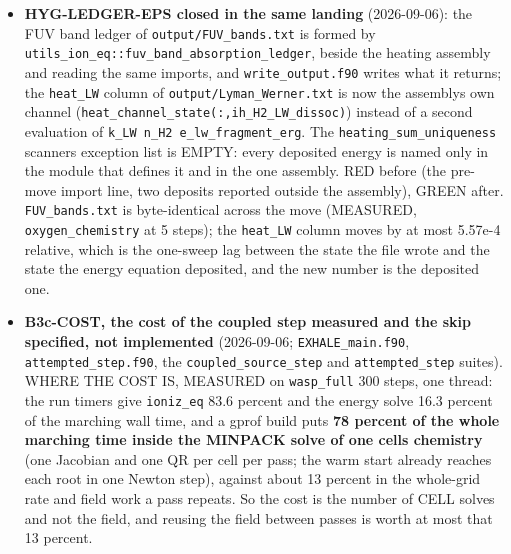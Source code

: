 \documentclass[english,a4paper]{my_memo}
\begin{document}
\begin{itemize}
  the He+ row of \texttt{mol\_heh\_rows} (\texttt{System\_HeH\_mol.f90}), not this item\textquotesingle s file;
  \texttt{dom\_cells\_HeP} is the observable.
  \textbf{Not done, carried over:} the thermodynamic CO ceiling is still in
  \texttt{limit\_to\_element\_budget}; deleting it changes \texttt{EXHALE\_main.f90},
  \texttt{certification.f90} and \texttt{write\_setup\_report.f90}, none of them this
  item\textquotesingle s files. The exact lines are in the item\textquotesingle s report.
\item
  \textbf{HYG-LEDGER-EPS closed in the same landing} (2026-09-06): the FUV band
  ledger of \texttt{output/FUV\_bands.txt} is formed by
  \texttt{utils\_ion\_eq::fuv\_band\_absorption\_ledger}, beside the heating assembly
  and reading the same imports, and \texttt{write\_output.f90} writes what it
  returns; the \texttt{heat\_LW} column of \texttt{output/Lyman\_Werner.txt} is now the
  assembly\textquotesingle s own channel (\texttt{heat\_channel\_state(:,ih\_H2\_LW\_dissoc)}) instead
  of a second evaluation of \texttt{k\_LW\ n\_H2\ e\_lw\_fragment\_erg}. The
  \texttt{heating\_sum\_uniqueness} scanner\textquotesingle s exception list is EMPTY: every
  deposited energy is named only in the module that defines it and in the
  one assembly. RED before (the pre-move import line, two deposits reported
  outside the assembly), GREEN after. \texttt{FUV\_bands.txt} is byte-identical
  across the move (MEASURED, \texttt{oxygen\_chemistry} at 5 steps); the \texttt{heat\_LW}
  column moves by at most 5.57e-4 relative, which is the one-sweep lag
  between the state the file wrote and the state the energy equation
  deposited, and the new number is the deposited one.
\item
  \textbf{B3c-COST, the cost of the coupled step measured and the skip specified,
  not implemented} (2026-09-06; \texttt{EXHALE\_main.f90}, \texttt{attempted\_step.f90},
  the \texttt{coupled\_source\_step} and \texttt{attempted\_step} suites). WHERE THE COST IS,
  MEASURED on \texttt{wasp\_full} 300 steps, one thread: the run timers give
  \texttt{ioniz\_eq} 83.6 percent and the energy solve 16.3 percent of the marching
  wall time, and a gprof build puts \textbf{78 percent of the whole marching time
  inside the MINPACK solve of one cell\textquotesingle s chemistry} (one Jacobian and one QR
  per cell per pass; the warm start already reaches each root in one Newton
  step), against about 13 percent in the whole-grid rate and field work a
  pass repeats. So the cost is the number of CELL solves and not the field,
  and reusing the field between passes is worth at most that 13 percent.

\end{itemize}
\end{document}

